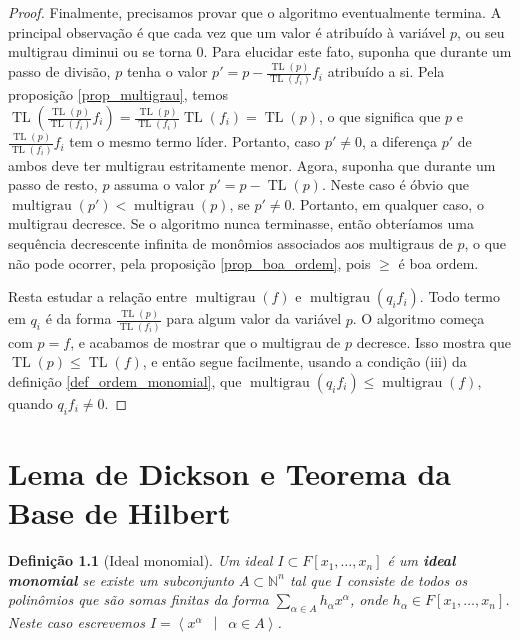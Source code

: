 \documentclass[12pt,a4paper]{report}
\newcommand{\N}{\mathbb{N}}
\newcommand{\suchthat}{\enspace\middle|\enspace}
\newtheorem{definition}[theorem]{Definição}
\numberwithin{theorem}{chapter}
\DeclareMathOperator{\multigrau}{multigrau}
\DeclareMathOperator{\TL}{TL}
\begin{document}
\begin{proof}
Finalmente, precisamos provar que o algoritmo eventualmente termina.
A principal observação é que cada vez que um valor é atribuído à
variável \(p\), ou seu multigrau diminui ou se torna \(0\).  Para
elucidar este fato, suponha que durante um passo de divisão, \(p\)
tenha o valor \(p' = p - \frac{\TL(p)}{\TL(f_i)}f_i\) atribuído a si.
Pela proposição \ref{prop_multigrau}, temos
\(\TL\left(\frac{\TL(p)}{\TL(f_i)}f_i\right) =
\frac{\TL(p)}{\TL(f_i)}\TL(f_i) = \TL(p)\), o que significa que \(p\)
e \(\frac{\TL(p)}{\TL(f_i)}f_i\) tem o mesmo termo líder.  Portanto,
caso \(p' \neq 0\), a diferença \(p'\) de ambos deve ter multigrau
estritamente menor.  Agora, suponha que durante um passo de resto,
\(p\) assuma o valor \(p' = p - \TL(p)\).  Neste caso é óbvio que
\(\multigrau(p') < \multigrau(p)\), se \(p' \neq 0\).  Portanto, em
qualquer caso, o multigrau decresce.  Se o algoritmo nunca terminasse,
então obteríamos uma sequência decrescente infinita de monômios
associados aos multigraus de \(p\), o que não pode ocorrer, pela
proposição \ref{prop_boa_ordem}, pois \(\geq\) é boa ordem.

Resta estudar a relação entre \(\multigrau(f)\) e
\(\multigrau(q_if_i)\).  Todo termo em \(q_i\) é da forma
\(\frac{\TL(p)}{\TL(f_i)}\) para algum valor da variável \(p\).  O
algoritmo começa com \(p = f\), e acabamos de mostrar que o multigrau
de \(p\) decresce.  Isso mostra que \(\TL(p) \leq \TL(f)\), e então
segue facilmente, usando a condição (iii) da definição
\ref{def_ordem_monomial}, que \(\multigrau(q_if_i) \leq
\multigrau(f)\), quando \(q_if_i \neq 0\).
\end{proof}



\chapter{Lema de Dickson e Teorema da Base de Hilbert}

\begin{definition}[Ideal monomial]
  Um ideal \(I \subset F[x_1,\ldots,x_n]\) é um \textbf{ideal
    monomial} se existe um subconjunto \(A \subset \N^n\) tal que
  \(I\) consiste de todos os polinômios que são somas finitas da forma
  \(\sum\limits_{\alpha \in A}h_\alpha x^\alpha\), onde \(h_\alpha \in
  F[x_1,\ldots,x_n]\).  Neste caso escrevemos \(I = \left\langle
    x^\alpha \suchthat \alpha \in A \right\rangle\).
\end{definition}
\end{document}
